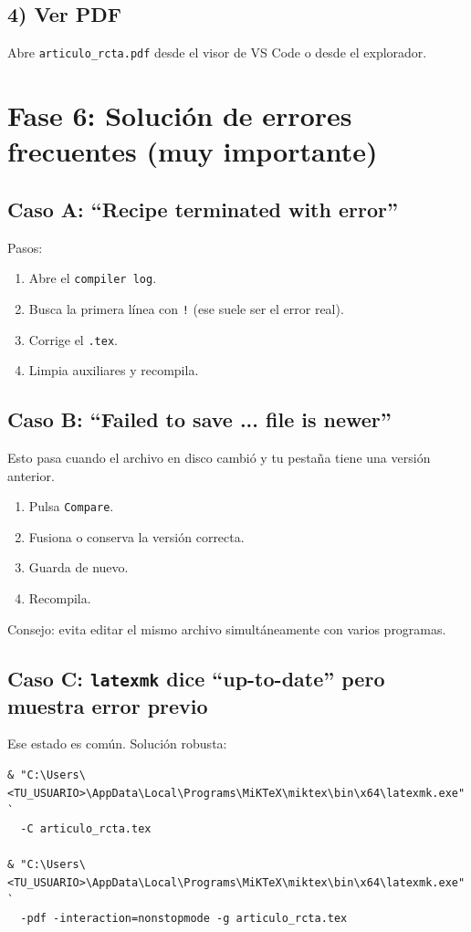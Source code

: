 \documentclass[11pt]{article}
\begin{document}
\subsection{4) Ver PDF}
Abre \texttt{articulo\_rcta.pdf} desde el visor de VS Code o desde el explorador.

\section{Fase 6: Soluci\'on de errores frecuentes (muy importante)}
\subsection{Caso A: ``Recipe terminated with error''}
Pasos:
\begin{enumerate}
  \item Abre el \texttt{compiler log}.
  \item Busca la primera l\'inea con \texttt{!} (ese suele ser el error real).
  \item Corrige el \texttt{.tex}.
  \item Limpia auxiliares y recompila.
\end{enumerate}

\subsection{Caso B: ``Failed to save ... file is newer''}
Esto pasa cuando el archivo en disco cambi\'o y tu pesta\~na tiene una versi\'on anterior.
\begin{enumerate}
  \item Pulsa \texttt{Compare}.
  \item Fusiona o conserva la versi\'on correcta.
  \item Guarda de nuevo.
  \item Recompila.
\end{enumerate}

Consejo: evita editar el mismo archivo simult\'aneamente con varios programas.

\subsection{Caso C: \texttt{latexmk} dice ``up-to-date'' pero muestra error previo}
Ese estado es com\'un. Soluci\'on robusta:
\begin{verbatim}
& "C:\Users\<TU_USUARIO>\AppData\Local\Programs\MiKTeX\miktex\bin\x64\latexmk.exe" `
  -C articulo_rcta.tex

& "C:\Users\<TU_USUARIO>\AppData\Local\Programs\MiKTeX\miktex\bin\x64\latexmk.exe" `
  -pdf -interaction=nonstopmode -g articulo_rcta.tex
\end{verbatim}
\end{document}
